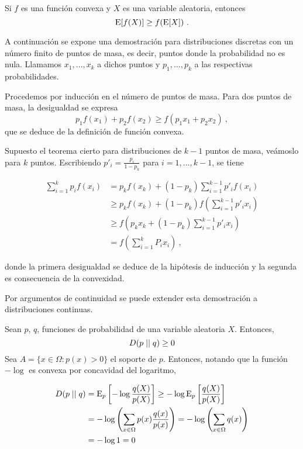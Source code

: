Si \(f\) es una función convexa y \(X\) es una variable aleatoria,
entonces \[\mathrm{E}[f(X)]\geq f(\mathrm{E}[X])~.\]

\proofb
A continuación se expone una demostración para distribuciones discretas
con un número finito de puntos de masa, es decir, puntos donde la
probabilidad no es nula. Llamamos \(x_1, \dots, x_k\) a dichos puntos y
\(p_1, \dots, p_k\) a las respectivas probabilidades.

Procedemos por inducción en el número de puntos de masa. Para dos puntos
de masa, la desigualdad se expresa
\[p_1f(x_1)+p_2f(x_2)\geq f(p_1x_1+p_2x_2)~,\] que se deduce de la
definición de función convexa.

Supuesto el teorema cierto para distribuciones de \(k-1\) puntos de
masa, veámoslo para \(k\) puntos. Escribiendo
\(p'_{i}=\frac{p_{i}}{1-p_k}\) para \(i=1,\dots,k-1\), se tiene

\begin{align*}
  \sum_{i=1}^kp_if(x_i)&=p_kf(x_k)+(1-p_k)\sum_{i=1}^{k-1}p'_if(x_i)\\
                       &\geq p_kf(x_k)+(1-p_k)f\left(\sum_{i=1}^{k-1}p'_ix_i\right)\\
                       &\geq f\left(p_kx_k+(1-p_k) \sum_{i=1}^{k-1}p'_ix_i\right)\\
                       &=f\left(\sum_{i=1}^kP_ix_i\right)~,  
\end{align*}

donde la primera desigualdad se deduce de la hipótesis de inducción y la
segunda es consecuencia de la convexidad.

Por argumentos de continuidad se puede extender esta demostración a
distribuciones continuas. \proofe
\theoe

Sean \(p\), \(q\), funciones de probabilidad de una variable aleatoria
\(X\). Entonces, \[D(p\mid\mid q)\geq 0\] \proofb
Sea \(A=\{x\in\Omega :p(x)>0\}\) el soporte de \(p\). Entonces, notando
que la función \(-\log\) es convexa por concavidad del logaritmo,

\begin{align*}
  D(p\mid\mid q)&=\mathrm{E}_p\left[-\log\frac{q(X)}{p(X)}\right]\geq -\log\mathrm{E}_p\left[\frac{q(X)}{p(X)}\right]\\
            &=-\log\left(\sum_{x\in\Omega}p(x)\frac{q(x)}{p(x)}\right)=-\log\left(\sum_{x\in\Omega}q(x)\right)\\
            &=-\log 1= 0
\end{align*}

